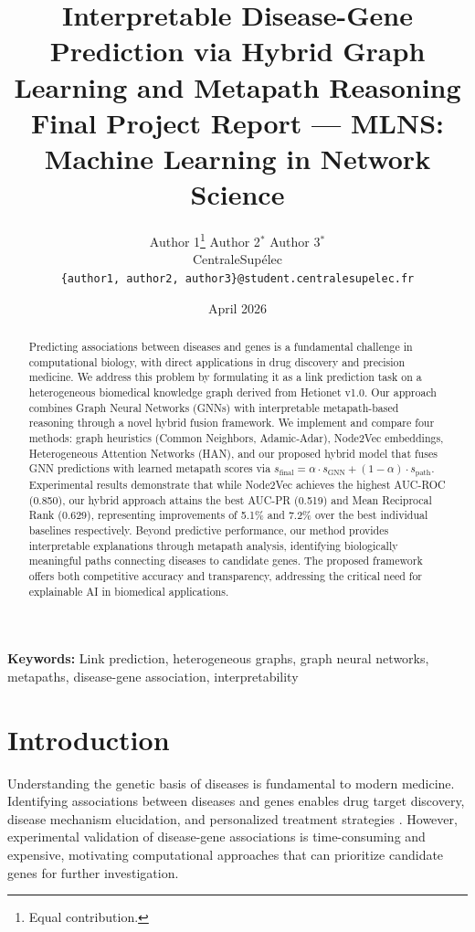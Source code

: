 \documentclass[11pt]{article}
\title{Interpretable Disease-Gene Prediction via Hybrid Graph Learning and Metapath Reasoning\\[0.5em]
\large Final Project Report --- MLNS: Machine Learning in Network Science}
\author{
Author 1\thanks{Equal contribution.} \quad
Author 2$^*$ \quad
Author 3$^*$\\[0.3em]
CentraleSup\'elec\\
\texttt{\{author1, author2, author3\}@student.centralesupelec.fr}
}
\date{April 2026}
\begin{document}
\maketitle

\begin{abstract}
Predicting associations between diseases and genes is a fundamental challenge in computational biology, with direct applications in drug discovery and precision medicine. We address this problem by formulating it as a link prediction task on a heterogeneous biomedical knowledge graph derived from Hetionet v1.0. Our approach combines Graph Neural Networks (GNNs) with interpretable metapath-based reasoning through a novel hybrid fusion framework. We implement and compare four methods: graph heuristics (Common Neighbors, Adamic-Adar), Node2Vec embeddings, Heterogeneous Attention Networks (HAN), and our proposed hybrid model that fuses GNN predictions with learned metapath scores via $s_{\text{final}} = \alpha \cdot s_{\text{GNN}} + (1-\alpha) \cdot s_{\text{path}}$. Experimental results demonstrate that while Node2Vec achieves the highest AUC-ROC (0.850), our hybrid approach attains the best AUC-PR (0.519) and Mean Reciprocal Rank (0.629), representing improvements of 5.1\% and 7.2\% over the best individual baselines respectively. Beyond predictive performance, our method provides interpretable explanations through metapath analysis, identifying biologically meaningful paths connecting diseases to candidate genes. The proposed framework offers both competitive accuracy and transparency, addressing the critical need for explainable AI in biomedical applications.
\end{abstract}

\textbf{Keywords:} Link prediction, heterogeneous graphs, graph neural networks, metapaths, disease-gene association, interpretability

\section{Introduction}
\label{sec:intro}

Understanding the genetic basis of diseases is fundamental to modern medicine. Identifying associations between diseases and genes enables drug target discovery, disease mechanism elucidation, and personalized treatment strategies \citep{barabasi2011network}. However, experimental validation of disease-gene associations is time-consuming and expensive, motivating computational approaches that can prioritize candidate genes for further investigation.
\end{document}
